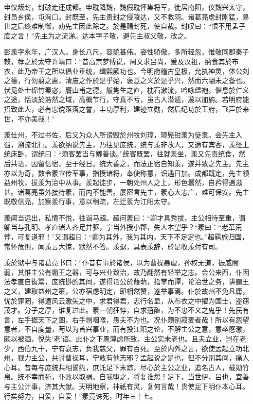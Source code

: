 \documentclass[12pt,UTF8]{ctexbook}
\begin{document}
申仪叛封，封破走还成都。申耽降魏，魏假耽怀集将军，徙居南阳，仪魏兴太守，封员乡侯，屯洵口。封既至，先主责封之侵陵达，又不救羽。诸葛亮虑封刚猛，易世之后终难制御，劝先主因此除之。於是赐封死，使自裁。封叹曰：“恨不用孟子度之言！”先主为之流涕。达本字子敬，避先主叔父敬，改之。

彭羕字永年，广汉人。身长八尺，容貌甚伟。姿性骄傲，多所轻忽，惟敬同郡秦子敕，荐之於太守许靖曰：“昔高宗梦傅说，周文求吕尚，爰及汉祖，纳食其於布衣，此乃帝王之所以倡业垂统，缉熙厥功也。今明府稽古皇极，允执神灵，体公刘之德，行勿翦之惠，清庙之作於是乎始，褒贬之义於是乎兴，然而六翮未之备也。伏见处士绵竹秦宓，膺山甫之德，履隽生之直，枕石漱流，吟咏缊袍，偃息於仁义之途，恬淡於浩然之域，高概节行，守真不亏，虽古人潜遁，蔑以加旃。若明府能招致此人，必有忠谠落落之誉，丰功厚利，建迹立勋，然后纪功於王府，飞声於来世，不亦美哉！”

羕仕州，不过书佐，后又为众人所谤毁於州牧刘璋，璋髡钳羕为徒隶。会先主入蜀，溯流北行。羕欲纳说先主，乃往见庞统。统与羕非故人，又適有宾客，羕径上统床卧，谓统曰：“须客罢当与卿善谈。”统客既罢，往就羕坐，羕又先责统食，然后共语，因留信宿，至于经日。统大善之，而法正宿自知羕，遂并致之先主。先主亦以为奇，数令羕宣传军事，指授诸将，奉使称意，识遇日加。成都既定，先主领益州牧，拔羕为治中从事。羕起徒步，一朝处州人之上，形色嚣然，自矜得遇滋甚。诸葛亮虽外接待羕，而内不能善。屡密言先主，羕心大志广，难可保安。先主既敬信亮，加察羕行事，意以稍疏，左迁羕为江阳太守。

羕闻当远出，私情不悦，往诣马超。超问羕曰：“卿才具秀拔，主公相待至重，谓卿当与孔明、孝直诸人齐足并驱，宁当外授小郡，失人本望乎？“羕曰：“老革荒悖，可复道邪！”又谓超曰：“卿为其外，我为其内，天下不足定也。”超羁旅归国，常怀危惧，闻羕言大惊，默然不答。羕退，具表羕辞，於是收羕付有司。

羕於狱中与诸葛亮书曰：“仆昔有事於诸侯，以为曹操暴虐，孙权无道，振威闇弱，其惟主公有霸王之器，可与兴业致治，故乃翻然有轻举之志。会公来西，仆因法孝直自衒鬻，庞统斟酌其间，遂得诣公於葭萌，指掌而谭，论治世之务，讲霸王之义，建取益州之策，公亦宿虑明定，即相然赞，遂举事焉。仆於故州不免凡庸，忧於罪罔，得遭风云激矢之中，求君得君，志行名显，从布衣之中擢为国士，盗窃茂才。分子之厚，谁复过此。羕一朝狂悖，自求菹醢，为不忠不义之鬼乎！先民有言，左手据天下之图，右手刎咽喉，愚夫不为也。况仆颇别菽麦者哉！所以有怨望意者，不自度量，苟以为首兴事业，而有投江阳之论，不解主公之意，意卒感激，颇以被酒，侻失'老'语。此仆之下愚薄虑所致，主公实未老也。且夫立业，岂在老少，西伯九十，宁有衰志，负我慈父，罪有百死。至於内外之言，欲使孟起立功北州，戮力主公，共讨曹操耳，宁敢有他志邪？孟起说之是也，但不分别其间，痛人心耳。昔每与庞统共相誓约，庶讬足下末踪，尽心於主公之业，追名古人，载勋竹帛。统不幸而死，仆败以取祸。自我堕之，将复谁怨！足下，当世伊、吕也，宜善与主公计事，济其大猷。天明地察，神祇有灵，复何言哉！贵使足下明仆本心耳。行矣努力，自爱，自爱！”羕竟诛死，时年三十七。
\end{document}
